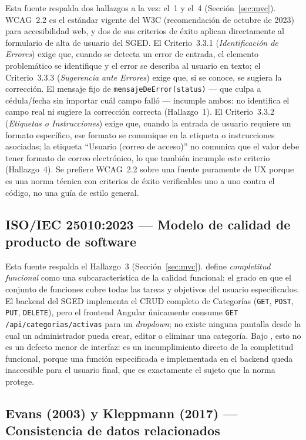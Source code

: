 \documentclass[12pt,a4paper]{article}
\begin{document}
Esta fuente respalda dos hallazgos a la vez: el~1 y el~4 (Sección~\ref{sec:mvc}). WCAG~2.2
\parencite{wcag22} es el estándar vigente del W3C (recomendación de octubre de 2023) para
accesibilidad web, y dos de sus criterios de éxito aplican directamente al formulario de alta
de usuario del SGED. El Criterio~3.3.1 (\textit{Identificación de Errores}) exige que, cuando
se detecta un error de entrada, el elemento problemático se identifique y el error se describa
al usuario en texto; el Criterio~3.3.3 (\textit{Sugerencia ante Errores}) exige que, si se
conoce, se sugiera la corrección. El mensaje fijo de \texttt{mensajeDeError(status)} --- que
culpa a cédula/fecha sin importar cuál campo falló --- incumple ambos: no identifica el campo
real ni sugiere la corrección correcta (Hallazgo~1). El Criterio~3.3.2 (\textit{Etiquetas o
Instrucciones}) exige que, cuando la entrada de usuario requiere un formato específico, ese
formato se comunique en la etiqueta o instrucciones asociadas; la etiqueta ``Usuario (correo
de acceso)'' no comunica que el valor debe tener formato de correo electrónico, lo que también
incumple este criterio (Hallazgo~4). Se prefiere WCAG~2.2 sobre una fuente puramente de UX
porque es una norma técnica con criterios de éxito verificables uno a uno contra el código,
no una guía de estilo general.

\subsection{ISO/IEC 25010:2023 --- Modelo de calidad de producto de software}

Esta fuente respalda el Hallazgo~3 (Sección~\ref{sec:mvc}). \textcite{iso25010} define
\textit{completitud funcional} como una subcaracterística de la calidad funcional: el grado
en que el conjunto de funciones cubre todas las tareas y objetivos del usuario especificados.
El backend del SGED implementa el CRUD completo de Categorías (\texttt{GET}, \texttt{POST},
\texttt{PUT}, \texttt{DELETE}), pero el frontend Angular únicamente consume
\texttt{GET /api/categorias/activas} para un \textit{dropdown}; no existe ninguna pantalla
desde la cual un administrador pueda crear, editar o eliminar una categoría. Bajo
\textcite{iso25010}, esto no es un defecto menor de interfaz: es un incumplimiento directo de
la completitud funcional, porque una función especificada e implementada en el backend queda
inaccesible para el usuario final, que es exactamente el sujeto que la norma protege.

\subsection{Evans (2003) y Kleppmann (2017) --- Consistencia de datos relacionados}
\end{document}

